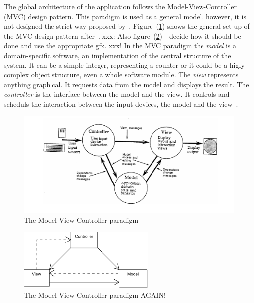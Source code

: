 The global architecture of the application follows the Model-View-Controller
(MVC) design pattern. This paradigm is used as a general model, however, 
it is not designed the strict way proposed by~.
Figure~(\ref{fig:modelviewcontroller}) shows the general set-up of the 
MVC design pattern after~. xxx: Also 
figure~(\ref{fig:modelviewcontroller2}) - decide how it should be done and use
the appropriate gfx. xxx!
In the MVC paradigm the \emph{model} is a domain-specific software, 
an implementation of the central structure of the system. It can be a simple
integer, representing a counter or it could be a higly complex object structure, 
even a whole software module. The \emph{view} represents anything graphical. 
It requests data from the model and displays the result. The \emph{controller} 
is the interface between the model and the view. It controls and scheduls the 
interaction between the input devices, the model and the 
view~.
\begin{figure}[htbp]
\begin{center}
\includegraphics[scale=0.5]{images/TechnicalDesign/MVC.png}
\caption{The Model-View-Controller paradigm}
\label{fig:modelviewcontroller}
\end{center}
\end{figure}

\begin{figure}[htbp]
\begin{center}
\includegraphics[scale=0.5]{images/TechnicalDesign/ModelViewControllerDiagram.png}
\caption{The Model-View-Controller paradigm AGAIN!}
\label{fig:modelviewcontroller2}
\end{center}
\end{figure}

